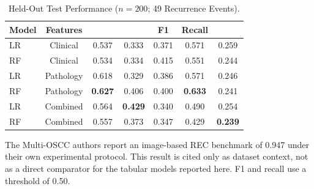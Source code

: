 \documentclass[11pt,a4paper]{article}
\newcommand{\ROC}{\text{ROC-AUC}}
\newcommand{\AUPRC}{\text{AUPRC}}
\newcommand{\Brier}{\text{Brier}}
\begin{document}
\begin{table}[htbp]

\centering

\small

\caption{Held-Out Test Performance ($n=200$; 49 Recurrence Events).}

\label{tab:performance}

\scriptsize
\begin{tabular*}{\linewidth}{@{\extracolsep{\fill}}lcccccc@{}}

\toprule

\textbf{Model} & \textbf{Features} & \textbf{\ROC{}} & \textbf{\AUPRC{}} & \textbf{F1} & \textbf{Recall} & \textbf{\Brier{}} \\

\midrule

LR & Clinical & 0.537 & 0.333 & 0.371 & 0.571 & 0.259 \\

RF & Clinical & 0.534 & 0.334 & 0.415 & 0.551 & 0.244 \\

LR & Pathology & 0.618 & 0.329 & 0.386 & 0.571 & 0.246 \\

RF & Pathology & \textbf{0.627} & 0.406 & 0.400 & \textbf{0.633} & 0.241 \\

LR & Combined & 0.564 & \textbf{0.429} & 0.340 & 0.490 & 0.254 \\

RF & Combined & 0.557 & 0.373 & 0.347 & 0.429 & \textbf{0.239} \\

\bottomrule

\end{tabular*}

\vspace{0.1cm}

\parbox{\linewidth}{\footnotesize The Multi-OSCC authors report an image-based REC benchmark of 0.947 under their own experimental protocol. This result is cited only as dataset context, not as a direct comparator for the tabular models reported here. F1 and recall use a threshold of 0.50.}

\end{table}
\end{document}
